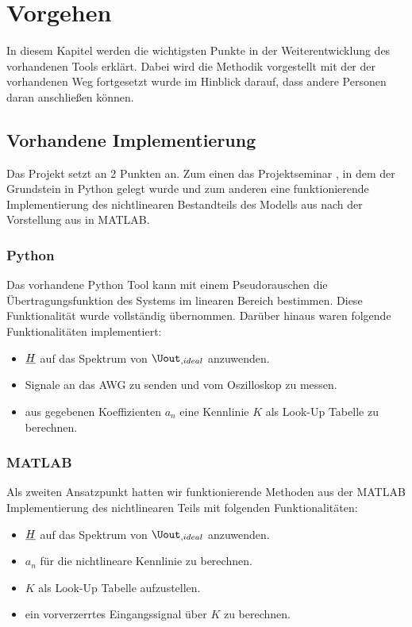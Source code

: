\documentclass[../Report.tex]{subfiles}
\begin{document}
\chapter{Vorgehen}
\label{chap:vorgehen}
In diesem Kapitel werden die wichtigsten Punkte in der Weiterentwicklung des vorhandenen Tools erklärt. Dabei wird die Methodik vorgestellt mit der der vorhandenen Weg fortgesetzt wurde im Hinblick darauf, dass andere Personen daran anschließen können.
\section[Vorhandene Implementierung]{Vorhandene Implementierung}
\label{sec:vorg.setup}
Das Projekt setzt an 2 Punkten an. Zum einen das Projektseminar \cite{PJS_Denys}, in dem der Grundstein in Python gelegt wurde und zum anderen eine funktionierende Implementierung des nichtlinearen Bestandteils des Modells aus  nach der Vorstellung aus \cite{harzheim} in MATLAB.
\subsection{Python}
\label{sec:vorg.python}
Das vorhandene Python Tool kann mit einem Pseudorauschen die Übertragungsfunktion des Systems im linearen Bereich bestimmen. Diese Funktionalität wurde vollständig übernommen. Darüber hinaus waren folgende Funktionalitäten implementiert:
\begin{itemize}
	\item	$\underline{H}$ auf das Spektrum von $\Uout_{,ideal}$ anzuwenden.
	
	\item	Signale an das AWG zu senden und vom Oszilloskop zu messen.
	
	\item	aus gegebenen Koeffizienten $a_n$ eine Kennlinie $K$ als Look-Up Tabelle zu berechnen.
\end{itemize}
\subsection{MATLAB}
\label{sec:vorg.matlab}
Als zweiten Ansatzpunkt hatten wir funktionierende Methoden aus der MATLAB Implementierung des nichtlinearen Teils mit folgenden Funktionalitäten:
\begin{itemize}
	\item	$\underline{H}$ auf das Spektrum von $\Uout_{,ideal}$ anzuwenden.
	
	\item	$a_n$ für die nichtlineare Kennlinie zu berechnen.
	
	\item	$K$ als Look-Up Tabelle aufzustellen.
	
	\item	ein vorverzerrtes Eingangssignal über $K$ zu berechnen.
\end{itemize}
\end{document}
